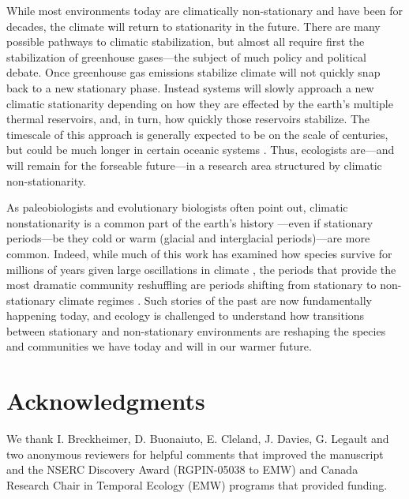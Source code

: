 \documentclass[11pt,letterpaper]{article}
\begin{document}
While most environments today are climatically non-stationary and have been for decades, the climate will return to stationarity in the future. There are many possible pathways to climatic stabilization, but almost all require first the stabilization of greenhouse gases---the subject of much policy and political debate. Once greenhouse gas emissions stabilize climate will not quickly snap back to a new stationary phase. Instead systems will slowly approach a new climatic stationarity depending on how they are effected by the earth's multiple thermal reservoirs, and, in turn, how quickly those reservoirs stabilize. The timescale of this approach is generally expected to be on the scale of centuries, but could be much longer in certain oceanic systems \citep{ipcc2013ch12}. Thus, ecologists are---and will remain for the forseable future---in a research area structured by climatic non-stationarity. 

As paleobiologists and evolutionary biologists often point out, climatic nonstationarity is a common part of the earth's history \citep{Jansson:2002nz}---even if stationary periods---be they cold or warm (glacial and interglacial periods)---are more common. Indeed, while much of this work has examined how species survive for millions of years given large oscillations in climate \citep{provan2008}, the periods that provide the most dramatic community reshuffling are periods shifting from stationary to non-stationary climate regimes \citep{vrba1980,vrba1985}. Such stories of the past are now fundamentally happening today, and ecology is challenged to understand how transitions between stationary and non-stationary environments are reshaping the species and communities we have today and will in our warmer future. 

\section{Acknowledgments}
We thank I. Breckheimer, D. Buonaiuto, E. Cleland, J. Davies, G. Legault and two anonymous reviewers for helpful comments that improved the manuscript and the NSERC Discovery Award (RGPIN-05038 to EMW) and Canada Research Chair in Temporal Ecology (EMW) programs that provided funding. 

\end{document}
